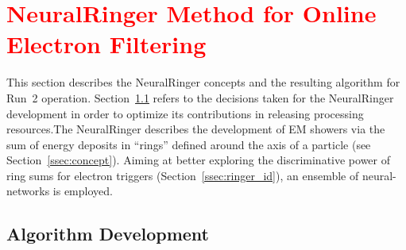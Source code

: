 \section{\textcolor{red}{NeuralRinger Method for Online Electron Filtering}}%
\label{sec:neuralringer}

This section describes the NeuralRinger concepts and the resulting algorithm for Run~2
operation.  Section~\ref{ssec:rnn_for_online_and_eletrons} refers to the
decisions taken for the NeuralRinger development in order to optimize its contributions in releasing processing resources.The NeuralRinger describes the development of EM showers via the sum of energy deposits in ``rings'' defined around the axis of a particle (see Section~\ref{ssec:concept}). Aiming at better exploring the discriminative
power of ring sums for electron triggers (Section~\ref{ssec:ringer_id}),
an ensemble of neural-networks is employed.

\subsection{Algorithm Development}\label{ssec:rnn_for_online_and_eletrons}



